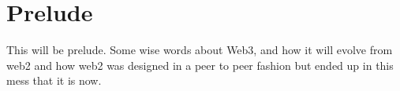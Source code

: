 \chapter*{Prelude}

This will be prelude. Some wise words about Web3, and how it will evolve from web2 and how web2 was designed in a peer to peer fashion but ended up in this mess that it is now.